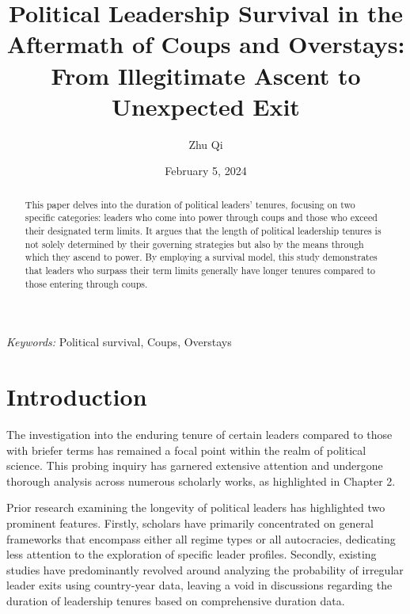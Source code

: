 \documentclass[
  12pt,
  a4paper,
  12pt]{article}
\begin{document}
\def\spacingset#1{\renewcommand{\baselinestretch}%
{#1}\small\normalsize} \spacingset{1}



\date{February 5, 2024}
\title{\bf Political Leadership Survival in the Aftermath of Coups and
Overstays: From Illegitimate Ascent to Unexpected Exit}
\author{
Zhu Qi\\
}
\maketitle

\bigskip
\bigskip
\begin{abstract}
This paper delves into the duration of political leaders' tenures,
focusing on two specific categories: leaders who come into power through
coups and those who exceed their designated term limits. It argues that
the length of political leadership tenures is not solely determined by
their governing strategies but also by the means through which they
ascend to power. By employing a survival model, this study demonstrates
that leaders who surpass their term limits generally have longer tenures
compared to those entering through coups.
\end{abstract}

\noindent%
{\it Keywords:} Political survival, Coups, Overstays
\vfill

\newpage
\spacingset{1.9} %

\section{Introduction}\label{introduction}

The investigation into the enduring tenure of certain leaders compared
to those with briefer terms has remained a focal point within the realm
of political science. This probing inquiry has garnered extensive
attention and undergone thorough analysis across numerous scholarly
works, as highlighted in Chapter 2.

Prior research examining the longevity of political leaders has
highlighted two prominent features. Firstly, scholars have primarily
concentrated on general frameworks that encompass either all regime
types or all autocracies, dedicating less attention to the exploration
of specific leader profiles. Secondly, existing studies have
predominantly revolved around analyzing the probability of irregular
leader exits using country-year data, leaving a void in discussions
regarding the duration of leadership tenures based on comprehensive
duration data.
\end{document}
